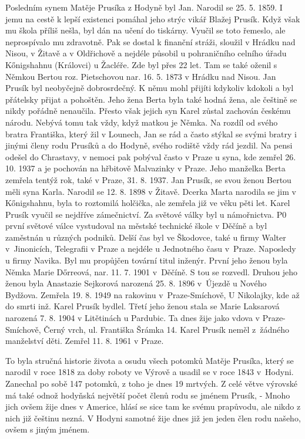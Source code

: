 \documentclass[../dejiny-rodu-prusiku.tex]{subfiles}
\begin{document}
Posledním synem Matěje Prusíka z Hodyně byl Jan. Narodil se 25. 5. 1859. I jemu na cestě k lepší existenci pomáhal jeho strýc vikář Blažej Prusík. Když však mu škola příliš nešla, byl dán na učení do tiskárny. Vyučil se toto řemeslo, ale neprospívalo mu zdravotně. Pak se dostal k finanční stráži, sloužil v Hrádku nad Nisou, v Žitavě a v Oldřichově a nejdéle působil u pohraničního celního úřadu Kőnigshahnu (Královci) u Žacléře. Zde byl přes 22 let. Tam se také oženil s Němkou Bertou roz. Pietschovou nar. 16. 5. 1873 v Hrádku nad Nisou. Jan Prusík byl neobyčejně dobrosrdečný. K němu mohl přijíti kdykoliv kdokoli a byl přátelsky přijat a pohoštěn. Jeho žena Berta byla také hodná žena, ale češtině se nikdy pořádně nenaučila. Přesto však jejich syn Karel zůstal zachován českému národu. Nebývá tomu tak vždy, když matkou je Němka. Na rozdíl od svého bratra Františka, který žil v Lounech, Jan se rád a často stýkal se svými bratry i jinými členy rodu Prusíků a do Hodyně, svého rodiště vždy rád jezdil. Na pensi odešel do Chrastavy, v nemoci pak pobýval často v Praze u syna, kde zemřel 26. 10. 1937 a je pochován na hřbitově Malvazinky v Praze. Jeho manželka Berta zemřela tentýž rok, také v Praze, 31. 8. 1937. Jan Prusík, se svou ženou Bertou měli syna Karla. Narodil se 12. 8. 1898 v Žitavě. Dcerka Marta narodila se jim v Kőnigshahnu, byla to roztomilá holčička, ale zemře­la již ve věku pěti let. Karel Prusík vyučil se nejdříve zámečnictví. Za světové války byl u námořnictva. P0 první světové válce vystudoval na městské technické škole v Děčíně a byl zaměstnán u různých podniků. Delší čas byl ve Škodovce, také u firmy Walter v Jinonicích, Telegrafii v Praze a nejdéle u Jednotného času v Praze. Naposledy u firmy Navika. Byl mu propůjčen tovární titul inženýr. První jeho ženou byla Němka  Marie Dőrreová, nar. 11. 7. 1901 v Děčíně. S tou se rozvedl. Druhou jeho ženou byla Anastazie Sejkorová narozená 25. 8. 1896 v Újezdě u Nového Bydžova. Zemřela 19. 8. 1949 na rakovinu v Praze-Smíchově,  U Nikolajky, kde až do smrti inž. Karel Prusík bydlel. Třetí jeho ženou stala se Marie Laksarová narozená 7. 8. 1904 v Litětinách u Pardubic. Ta dnes žije jako vdova v Praze-Smíchově, Černý vrch, ul. Františka Šrámka 14. Karel Prusík neměl z žádného manželství děti. Zemřel 11. 8. 1961 v Praze.


To byla stručná historie života a osudu všech potomků  Matěje Prusíka, který se narodil v roce 1818 za doby roboty ve Výrově a usadil se v roce 1843 v Hodyni. Zanechal po sobě 147 potomků, z toho je dnes 19 mrtvých. Z celé větve výrovské má také odnož hodyňská největší počet členů rodu se jménem Prusík, - Mnoho jich ovšem žije dnes v Americe, hlásí se sice tam ke svému prapůvodu, ale nikdo z nich již češtinu nezná. V Hodyni samotné žije dnes již jen jeden člen rodu našeho, ovšem s jiným jménem.
\end{document}
